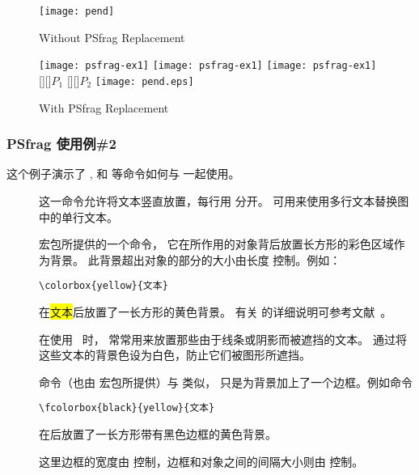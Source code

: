 \begin{figure}
\begin{minipage}[t]{.5\textwidth}
\vspace{0pt}
\centering
\texttt{[image: pend]}
\caption{Without PSfrag Replacement}\label{fig:nopsfrag}
\end{minipage}%
\begin{minipage}[t]{.5\textwidth}
\vspace{0pt}
\centering
\ifxetex
\texttt{[image: psfrag-ex1]}
\else
\ifpdf
\texttt{[image: psfrag-ex1]}
\else
\ifdvipdfm
\texttt{[image: psfrag-ex1]}
\else
{}
[][]{$P_1$}
[][]{\large $P_2$}
\texttt{[image: pend.eps]}
\fi
\fi
\fi
\caption{With PSfrag Replacement}\label{fig:psfragex1}
\end{minipage}
\end{figure}

\subsubsection{PSfrag 使用例\#2}\label{sssec:psfragex2}

这个例子演示了 ,  和  等命令如何与  一起使用。

\begin{description}
\item[] 这一命令允许将文本竖直放置，每行用 \cmd{\cmd{}}分开。
	可用来使用多行文本替换图中的单行文本。
\item[]  宏包所提供的一个命令，
	它在所作用的对象背后放置长方形的彩色区域作为背景。
	此背景超出对象的部分的大小由长度  控制。例如：
\begin{lstlisting}
\colorbox{yellow}{文本}
\end{lstlisting}
	在{\colorbox{yellow}{文本}}后放置了一长方形的黄色背景。
	有关 的详细说明可参考文献~\cite{grfguide}。

	在使用 ~时， 常常用来放置那些由于线条或阴影而被遮挡的文本。
	通过将这些文本的背景色设为白色，防止它们被图形所遮挡。
\item[] 命令（也由  宏包所提供）与  类似，
	只是为背景加上了一个边框。例如命令
\begin{Verbatim}
\fcolorbox{black}{yellow}{文本}
\end{Verbatim}
	在{}后放置了一长方形带有黑色边框的黄色背景。

	这里边框的宽度由  控制，边框和对象之间的间隔大小则由  控制。
\end{description}


